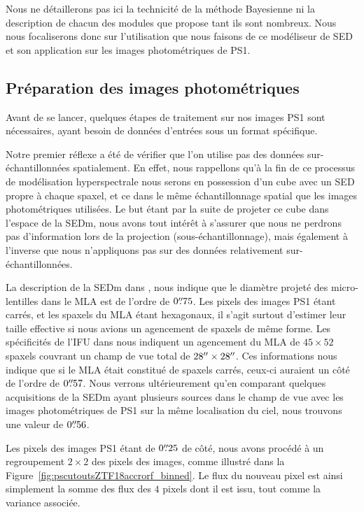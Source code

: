 \documentclass[../main/main.tex]{subfiles}
\begin{document}
Nous ne détaillerons pas ici la technicité de la méthode Bayesienne ni
la description de chacun des modules que propose  tant ils
sont nombreux. Nous nous focaliserons donc sur l'utilisation que nous faisons
de ce modéliseur de SED et son application sur les images photométriques
de PS1.

\subsection{Préparation des images photométriques}
\label{ssec:preprocessimages}

Avant de se lancer, quelques étapes de traitement sur nos images PS1
sont nécessaires,  ayant besoin de données d'entrées sous un
format spécifique.

Notre premier réflexe a été de vérifier que l'on utilise pas des données
sur-échantillonnées spatialement. En effet, nous rappellons qu'à la fin de
ce processus de modélisation hyperspectrale nous serons en possession
d'un cube avec un SED propre à chaque spaxel, et ce dans le même
échantillonnage spatial que les images photométriques utilisées. Le but
étant par la suite de projeter ce cube dans l'espace de la SEDm, nous avons
tout intérêt à s'assurer que nous ne perdrons pas d'information lors de
la projection (sous-échantillonnage), mais également à l'inverse que
nous n'appliquons pas  sur des données relativement
sur-échantillonnées.

La description de la SEDm dans \citet{SEDM18}, nous indique que le
diamètre projeté des micro-lentilles dans le MLA est de l'ordre de
$0\overset{\prime\prime}{.}75$. Les pixels des images PS1 étant carrés, et les spaxels du MLA étant hexagonaux, il s'agit surtout
d'estimer leur taille effective si nous avions un agencement de spaxels
de même forme. Les spécificités de l'IFU dans \citet{SEDM18} nous indiquent un
agencement du MLA de $45\times52$ spaxels couvrant un champ de vue total de
$28^{\prime\prime}\times28^{\prime\prime}$. Ces informations nous indique que si le MLA
était constitué de spaxels carrés, ceux-ci auraient un côté de l'ordre
de $0\overset{\prime\prime}{.}57$. Nous verrons ultérieurement qu'en
comparant quelques acquisitions de la SEDm ayant plusieurs sources dans
le champ de vue avec les images photométriques de PS1 sur la même
localisation du ciel, nous trouvons une valeur de $0\overset{\prime\prime}{.}56$.

Les pixels des images PS1 étant de $0\overset{\prime\prime}{.}25$ de côté, nous avons
procédé à un regroupement $2\times2$ des pixels des images, comme
illustré dans la Figure~\ref{fig:pscutoutsZTF18accrorf_binned}. Le flux
du nouveau pixel est ainsi simplement la somme des flux des $4$ pixels
dont il est issu, tout comme la variance associée.
\end{document}
